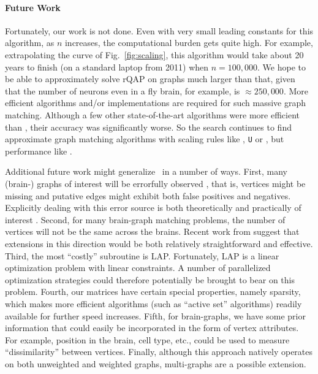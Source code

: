 \documentclass{article} %
\begin{document}
\vspace{-5pt}
\paragraph{Future Work}

Fortunately, our work is not done. Even with very small leading constants for this algorithm, as $n$ increases, the computational burden gets quite high.  For example, extrapolating the curve of Fig.\ \ref{fig:scaling}, this algorithm would take about 20 years to finish (on a standard laptop from 2011) when $n=100,000$.  We hope to be able to approximately solve rQAP on graphs much larger than that, given that the number of neurons even in a fly brain, for example, is $\approx 250,000$.  More efficient algorithms and/or implementations are required for such massive graph matching. Although a few other state-of-the-art algorithms were more efficient than \FAQ, their accuracy was significantly worse.  So the search continues to find approximate graph matching algorithms with scaling rules like \Qcv, \texttt{U} or \Rank, but performance like \FAQ.


Additional future work might generalize \FAQ\  in a number of ways.  First, many (brain-) graphs of interest will be errorfully observed \cite{Priebe2011}, that is, vertices might be missing and putative edges might exhibit both false positives and negatives.  Explicitly dealing with this error source is both theoretically and practically of interest \cite{VP11_unlabeled}.  
Second, for many brain-graph matching problems, the number of vertices will not be the same across the brains.  Recent work from \cite{Zaslavskiy2009, Zaslavskiy2010} suggest that extensions in this direction would be both relatively straightforward and effective. Third, the most ``costly'' subroutine is LAP.  Fortunately, LAP is a linear optimization problem with linear constraints.  A number of parallelized optimization strategies could therefore potentially be brought to bear on this problem.  Fourth, our matrices have certain special properties, namely sparsity, which makes more efficient algorithms (such as ``active set'' algorithms) readily available for further speed increases.  Fifth, for brain-graphs, we have some prior information that could easily be incorporated in the form of vertex attributes.  For example, position in the brain, cell type, etc., could be used to measure ``dissimilarity'' between vertices.  %
Finally, although this approach natively operates on both unweighted and weighted graphs, multi-graphs are a possible extension.
\end{document}
